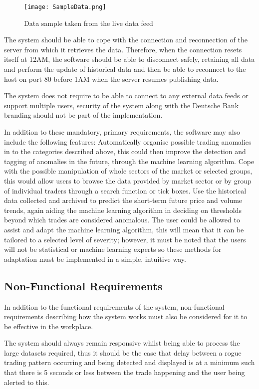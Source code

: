 \documentclass[11pt, oneside, a4paper]{article}
\begin{document}
\begin{figure}[h]
	\label{SampleData}
	\centering
		\texttt{[image: SampleData.png]}
	\caption{Data sample taken from the live data feed}
\end{figure}

The system should be able to cope with the connection and reconnection of the server from which it retrieves the
data. Therefore, when the connection resets itself at 12AM, the software should be able to disconnect safely,
retaining all data and perform the update of historical data and then be able to reconnect to the host on port 80
before 1AM when the server resumes publishing data.

The system does not require to be able to connect to any external data feeds or support multiple users, security
of the system along with the Deutsche Bank branding should not be part of the implementation.

In addition to these mandatory, primary requirements, the software may also include the following features:
Automatically organise possible trading anomalies in to the categories described above, this could then improve
the detection and tagging of anomalies in the future, through the machine learning algorithm. Cope with the
possible manipulation of whole sectors of the market or selected groups, this would allow users to browse the
data provided by market sector or by group of individual traders through a search function or tick boxes. Use
the historical data collected and archived to predict the short-term future price and volume trends, again
aiding the machine learning algorithm in deciding on thresholds beyond which trades are considered anomalous.
The user could be allowed to assist and adapt the machine learning algorithm, this will mean that it can be
tailored to a selected level of severity; however, it must be noted that the users will not be statistical or
machine learning experts so these methods for adaptation must be implemented in a simple, intuitive way.

\subsection{Non-Functional Requirements}
In addition to the functional requirements of the system, non-functional requirements describing how the system
works must also be considered for it to be effective in the workplace.

The system should always remain responsive whilst being able to process the large datasets required, thus it
should be the case that delay between a rogue trading pattern occurring and being detected and displayed is at
a minimum such that there is 5 seconds or less between the trade happening and the user being alerted to this.
\end{document}

